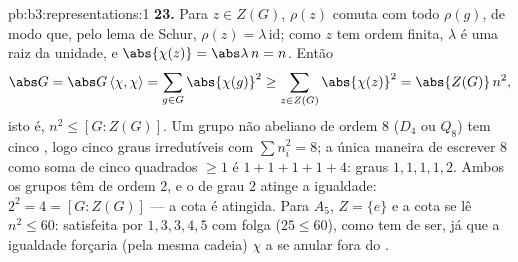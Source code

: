 \begin{solution}{pb:b3:representations:1}
\textbf{23.} Para $z \in Z(G)$, $\rho(z)$ comuta com todo
$\rho(g)$, de modo que, pelo lema de Schur, $\rho(z) = \lambda\,
\mathrm{id}$; como $z$ tem ordem finita, $\lambda$ é uma raiz
da unidade, e $\abs{\chi(z)} = \abs\lambda\,n = n$. Então
\[
\abs G = \abs G\,\langle\chi, \chi\rangle
= \sum_{g \in G}\abs{\chi(g)}^2
\geq \sum_{z \in Z(G)}\abs{\chi(z)}^2
= \abs{Z(G)}\,n^2,
\]
isto é, $n^2 \leq [G : Z(G)]$. Um grupo não abeliano de ordem $8$
($D_4$ ou $Q_8$) tem cinco , logo cinco
graus irredutíveis com $\sum n_i^2 = 8$; a única maneira de
escrever $8$ como soma de cinco quadrados $\geq 1$ é $1 + 1 + 1 + 1
+ 4$: graus $1, 1, 1, 1, 2$. Ambos os grupos têm  de
ordem $2$, e o  de grau $2$ atinge a igualdade:
$2^2 = 4 = [G : Z(G)]$ --- a cota é atingida. Para $A_5$,
$Z = \{e\}$ e a cota se lê $n^2 \leq 60$: satisfeita por
$1, 3, 3, 4, 5$ com folga ($25 \leq 60$), como tem de
ser, já que a igualdade forçaria (pela mesma cadeia) $\chi$ a
se anular fora do .


\end{solution}

